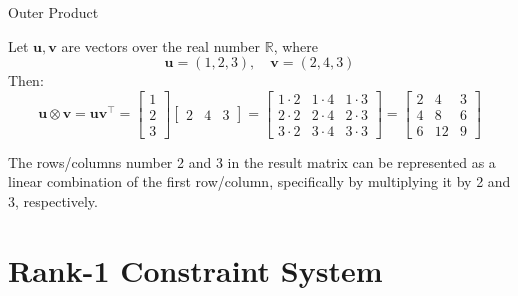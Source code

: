 \documentclass{beamer}
\begin{document}
    \begin{frame}{Outer Product}
        \begin{example}
            Let $\mathbf{u}, \mathbf{v}$ are vectors over the real number $\mathbb{R}$, where
            \begin{equation*}
                \mathbf{u} = (1, 2, 3), \quad \mathbf{v} = (2, 4, 3)
            \end{equation*}
            Then: 
            \begin{equation*}
                \mathbf{u} \otimes \mathbf{v} = \mathbf{u}\mathbf{v}^{\top} = \begin{bmatrix}
                1 \\ 2 \\ 3
                \end{bmatrix}\begin{bmatrix}
                2 & 4 & 3
                \end{bmatrix} = \begin{bmatrix}
                    1 \cdot 2 & 1 \cdot 4 & 1 \cdot 3 \\
                    2 \cdot 2 & 2 \cdot 4 & 2 \cdot 3 \\
                    3 \cdot 2 & 3 \cdot 4 & 3 \cdot 3
                \end{bmatrix} = \begin{bmatrix}
                    2 & 4 & 3 \\
                    4 & 8 & 6 \\
                    6 & 12 & 9
                \end{bmatrix}
            \end{equation*}

            \pause
            The rows/columns number 2 and 3 in the result matrix can be represented as a linear 
            combination of the first row/column, specifically by multiplying it by 2 and 3, 
            respectively. 
        \end{example}
    \end{frame}

    \section{Rank-1 Constraint System}
\end{document}
